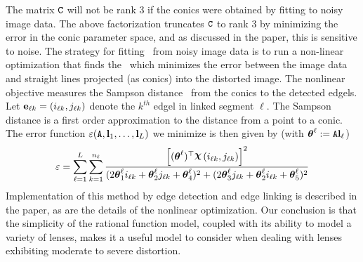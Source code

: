 \documentclass[extendedabs]{bmvc2k}
\begin{document}
The matrix $\mbox{\tt C}$ will not be rank 3 if the conics were obtained by
fitting to noisy image data.  The above factorization truncates $\mbox{\tt C}$
to rank 3 by minimizing the error in the conic parameter space, and as
discussed in the paper, this is sensitive to noise.  The strategy for
fitting \A\ from noisy image data is to run a non-linear optimization that
finds the \A\ which minimizes the error between the image data and straight
lines projected (as conics) into the distorted image.  The nonlinear
objective measures the Sampson distance~\cite{Hartley00} from the conics to
the detected edgels.  Let ${\bf e}_{\ell k} = (i_{\ell k},j_{\ell k})$
denote the $k^{th}$ edgel in linked segment $\ell$. The Sampson distance is
a first order approximation to the distance from a point to a conic. The
error function $\varepsilon(\mbox{\tt A}, {\bf l}_1, \ldots, {\bf l}_L)$ we
minimize is then given by (with ${\boldsymbol\theta}^\ell := \mbox{\tt A} {\bf l}_\ell$)
\begin{equation}
\def\t#1{\conic^\ell_{#1}}
\varepsilon =
\sum_{\ell = 1}^{L} \sum_{k=1}^{n_\ell }
\frac
{\left[(\conic^\ell)\tr\Chi\left(i_{\ell k},j_{\ell k}\right)\right]^2}
{(2\t1 i_{\ell k} + \t2 j_{\ell k} + \t4)^2 + (2\t3 j_{\ell k} +
\t2 i_{\ell k} + \t5)^2}
\nonumber
\end{equation}
Implementation of this method by edge detection and edge linking is
described in the paper, as are the details of the nonlinear optimization.
Our conclusion is that the simplicity of the rational function model,
coupled with its ability to model a variety of lenses, makes it a useful
model to consider when dealing with lenses exhibiting moderate to severe
distortion.


\end{document}

